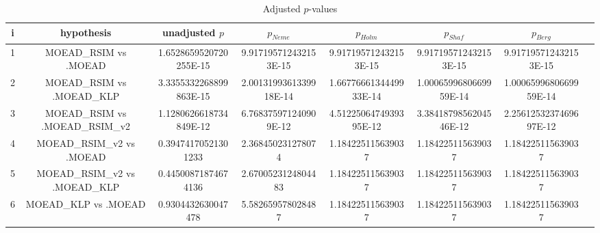\documentclass[a4paper,10pt]{article}
\begin{document}
\begin{landscape}
\begin{table}[!htp]
\centering\tiny
\caption{Adjusted $p$-values}
\begin{tabular}{cccccccc}
i&hypothesis&unadjusted $p$&$p_{Neme}$&$p_{Holm}$&$p_{Shaf}$&$p_{Berg}$\\
\hline
1&MOEAD_RSIM vs .MOEAD&1.6528659520720255E-15&9.917195712432153E-15&9.917195712432153E-15&9.917195712432153E-15&9.917195712432153E-15\\
2&MOEAD_RSIM vs .MOEAD_KLP&3.3355332268899863E-15&2.0013199361339918E-14&1.6677666134449933E-14&1.0006599680669959E-14&1.0006599680669959E-14\\
3&MOEAD_RSIM vs .MOEAD_RSIM_v2&1.1280626618734849E-12&6.768375971240909E-12&4.5122506474939395E-12&3.3841879856204546E-12&2.2561253237469697E-12\\
4&MOEAD_RSIM_v2 vs .MOEAD&0.39474170521301233&2.368450231278074&1.184225115639037&1.184225115639037&1.184225115639037\\
5&MOEAD_RSIM_v2 vs .MOEAD_KLP&0.44500871874674136&2.6700523124804483&1.184225115639037&1.184225115639037&1.184225115639037\\
6&MOEAD_KLP vs .MOEAD&0.9304432630047478&5.582659578028487&1.184225115639037&1.184225115639037&1.184225115639037\\
\hline
\end{tabular}
\end{table}

\end{landscape}
\end{document}
